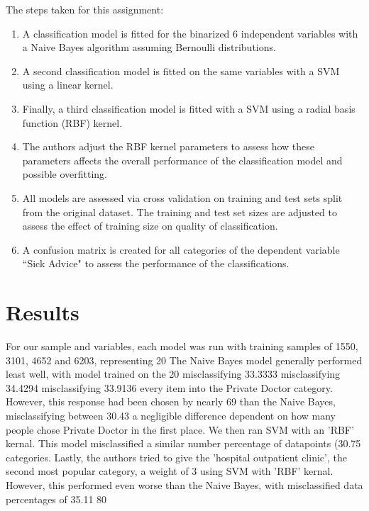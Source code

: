 \documentclass[10pt,twocolumn]{article}
\begin{document}
The steps taken for this assignment:

\begin{enumerate}
\item A classification model is fitted for the binarized 6 independent variables with
a Naive Bayes algorithm assuming Bernoulli distributions.
\item A second classification model is fitted on the same variables with
a SVM using a linear kernel.
\item Finally, a third classification model is fitted with a SVM using a radial basis
function (RBF) kernel.
\item The authors adjust the RBF kernel parameters to assess how these parameters
affects the overall performance of the classification model and possible overfitting.
\item All models are assessed via cross validation on training and test sets split
from the original dataset. The training and test set sizes are adjusted to assess the effect of training size on quality
of classification.
\item A confusion matrix is created for all categories of the dependent variable
``Sick Advice" to assess the performance of the classifications.
\end{enumerate}

\section{Results}

For our sample and variables, each model was run with training samples of 1550,
3101, 4652 and 6203, representing 20%
The Naive Bayes model generally performed least well, with model trained on the
20%
misclassifying 33.3333%
misclassifying 34.4294%
misclassifying 33.9136%
every item into the Private Doctor category. However, this response had been
chosen by nearly 69%
than the Naive Bayes, misclassifying between 30.43%
a negligible difference dependent on how many people chose Private Doctor in the first place.
We then ran SVM with an 'RBF' kernal. This model misclassified a similar number
percentage of datapoints (30.75%
categories. Lastly, the authors tried to give the 'hospital outpatient clinic', the second
most popular category, a weight of 3 using SVM with 'RBF' kernal. However, this
performed even worse than the Naive Bayes, with misclassified data percentages of
35.11%
80%
\end{document}

